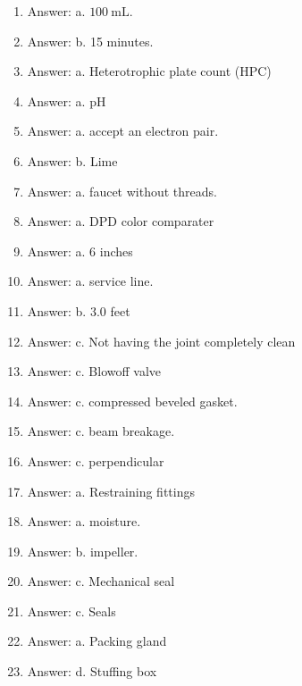 \documentclass[10pt]{article}
\begin{document}
\begin{enumerate}
  \item Answer: a. $100 \mathrm{~mL}$.

  \item Answer: b. 15 minutes.

  \item Answer: a. Heterotrophic plate count (HPC)

  \item Answer: a. $\mathrm{pH}$

  \item Answer: a. accept an electron pair.

  \item Answer: b. Lime

  \item Answer: a. faucet without threads.

  \item Answer: a. DPD color comparater

  \item Answer: a. 6 inches

  \item Answer: a. service line.

  \item Answer: b. $3.0$ feet

  \item Answer: c. Not having the joint completely clean

  \item Answer: c. Blowoff valve

  \item Answer: c. compressed beveled gasket.

  \item Answer: c. beam breakage.

  \item Answer: c. perpendicular

  \item Answer: a. Restraining fittings

  \item Answer: a. moisture.

  \item Answer: b. impeller.

  \item Answer: c. Mechanical seal

  \item Answer: c. Seals

  \item Answer: a. Packing gland

  \item Answer: d. Stuffing box


\end{enumerate}
\end{document}
